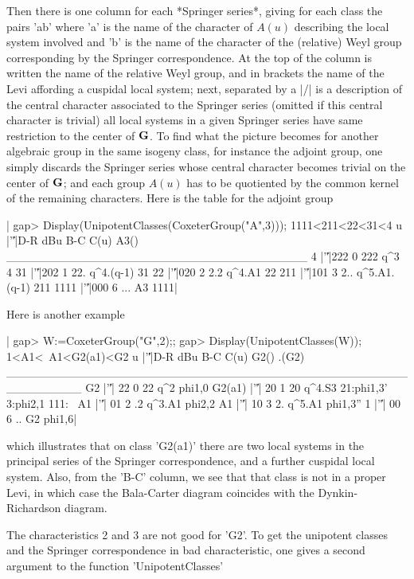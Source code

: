 Then  there is one column for each *Springer series*, giving for each class
the  pairs  'a\:b'  where  'a'  is  the  name  of  the  character of $A(u)$
describing  the local system involved and 'b'  is the name of the character
of  the (relative) Weyl group corresponding by the Springer correspondence.
At  the top of the  column is written the  name of the relative Weyl group,
and  in brackets the  name of the  Levi affording a  cuspidal local system;
next,  separated  by  a  |/|  is  a  description  of  the central character
associated  to the  Springer series  (omitted if  this central character is
trivial)\:  all  local  systems  in  a  given  Springer  series  have  same
restriction  to the center of  ${\bf G}$. To find what  the picture becomes for
another algebraic group in the same isogeny class, for instance the adjoint
group,  one  simply  discards  the  Springer series whose central character
becomes  trivial on the  center of ${\bf G}$;  and each group  $A(u)$ has to be
quotiented  by the common  kernel of the  remaining characters. Here is the
table for the adjoint group\:

|    gap> Display(UnipotentClasses(CoxeterGroup("A",3)));
    1111<211<22<31<4
       u |'\|'|D-R dBu B-C         C(u) A3()
    ____________________________________
    4    |'\|'|222   0 222          q^3    4
    31   |'\|'|202   1 22.    q^4.(q-1)   31
    22   |'\|'|020   2 2.2       q^4.A1   22
    211  |'\|'|101   3 2.. q^5.A1.(q-1)  211
    1111 |'\|'|000   6 ...           A3 1111|

Here is another example\:

|    gap> W:=CoxeterGroup("G",2);;
    gap> Display(UnipotentClasses(W));
    1<A1<~A1<G2(a1)<G2
         u |'\|'|D-R dBu B-C   C(u)                    G2() .(G2)
    _________________________________________________________
    G2     |'\|'| 22   0  22    q^2                phi{1,0}
    G2(a1) |'\|'| 20   1  20 q^4.S3 21:phi{1,3}' 3:phi{2,1}  111:
    ~A1    |'\|'| 01   2  .2 q^3.A1                phi{2,2}
    A1     |'\|'| 10   3  2. q^5.A1              phi{1,3}''
    1      |'\|'| 00   6  ..     G2                phi{1,6}|

which illustrates that on class 'G2(a1)' there are two local systems in the
principal  series of  the Springer  correspondence, and  a further cuspidal
local system. Also, from the 'B-C' column, we see that that class is not in
a  proper Levi,  in which  case the  Bala-Carter diagram coincides with the
Dynkin-Richardson diagram.

The  characteristics 2 and  3 are not  good for 'G2'.  To get the unipotent
classes  and the Springer correspondence in bad characteristic, one gives a
second argument to the function 'UnipotentClasses'\:

